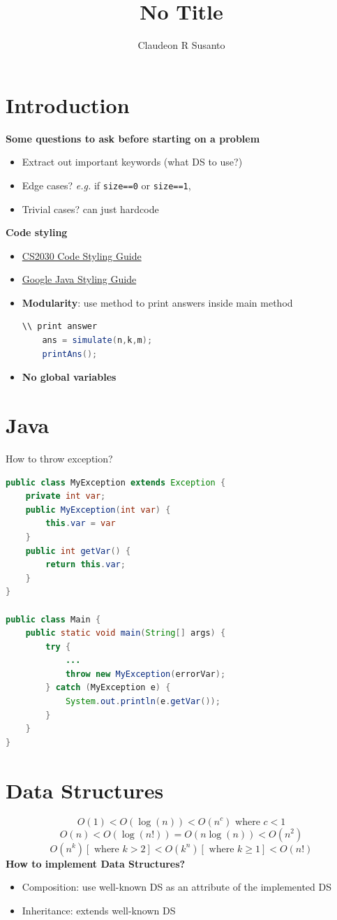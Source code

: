 \documentclass{article}
\title{No Title}
\author{Claudeon R Susanto}
\date{}
\newcommand{\eg}[0]{\textit{e.g. }}
\begin{document}
{}\selectfont
\begin{multicols}{2}
\section{Introduction}
\textbf{Some questions to ask before starting on a problem}
\begin{itemize}
	\item Extract out important keywords (what DS to use?)
	\item Edge cases? \eg if \texttt{size==0} or \texttt{size==1},
	\item Trivial cases? can just hardcode
\end{itemize}
\textbf{Code styling}
\begin{itemize}
	\item \href{https://nus-cs2030.github.io/1718-s2/style/index.html}{CS2030 Code Styling Guide}
	\item \href{https://google.github.io/styleguide/javaguide.html}{Google Java Styling Guide}
	\item \textbf{Modularity}: use method to print answers inside main method
	\begin{lstlisting}[language=java]
	\\ print answer
	ans = simulate(n,k,m);
	printAns();	\end{lstlisting}
    \item \textbf{No global variables}
\end{itemize}
\section{Java}

How to throw exception?
\begin{lstlisting}[language=Java]
public class MyException extends Exception {
	private int var;
	public MyException(int var) {
		this.var = var
	}
	public int getVar() {
		return this.var;
	}
}

public class Main {
	public static void main(String[] args) {
		try {
			...
			throw new MyException(errorVar);
		} catch (MyException e) {
			System.out.println(e.getVar());
		}
	}
}\end{lstlisting}




\section{Data Structures}
$$O(1) < O(\log{(n)}) < O(n^c) \text{ where } c<1 $$
$$O(n) <  O(\log{(n!)}) = O(n\log{(n)}) < O(n^2)$$
$$O(n^k)[\text{ where } k>2] < O(k^n) [\text{ where } k\geq1] < O(n!) $$
\textbf{How to implement Data Structures?}
\begin{itemize}
	\item Composition: use well-known DS as an attribute of the implemented DS
	\item Inheritance: extends well-known DS
\end{itemize}

\end{multicols}
\end{document}
